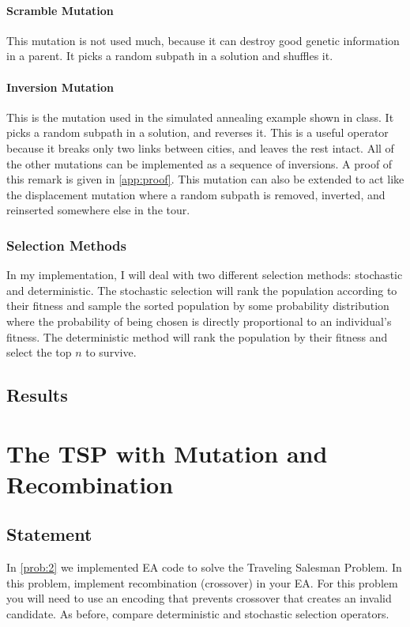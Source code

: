 \documentclass{article}
\begin{document}
\paragraph{Scramble Mutation} This mutation is not used much, because it can destroy good genetic
information in a parent. It picks a random subpath in a solution and shuffles it.
\paragraph{Inversion Mutation} This is the mutation used in the simulated annealing example shown
in class. It picks a random subpath in a solution, and reverses it. This is a useful operator
because it breaks only two links between cities, and leaves the rest intact. All of the other
mutations can be implemented as a sequence of inversions. A proof of this remark is given in
\autoref{app:proof}. This mutation can also be extended to act like the displacement mutation where
a random subpath is removed, inverted, and reinserted somewhere else in the tour.

\subsubsection{Selection Methods}
In my implementation, I will deal with two different selection methods: stochastic and
deterministic. The stochastic selection will rank the population according to their fitness and
sample the sorted population by some probability distribution where the probability of being chosen
is directly proportional to an individual's fitness. The deterministic method will rank the
population by their fitness and select the top $n$ to survive.

\subsection{Results}

\section{The TSP with Mutation and Recombination}\label{prob:3}
\subsection{Statement}
In \autoref{prob:2} we implemented EA code to solve the Traveling Salesman Problem. In this
problem, implement recombination (crossover) in your EA. For this problem you will need to use an
encoding that prevents crossover that creates an invalid candidate. As before, compare
deterministic and stochastic selection operators.
\end{document}
